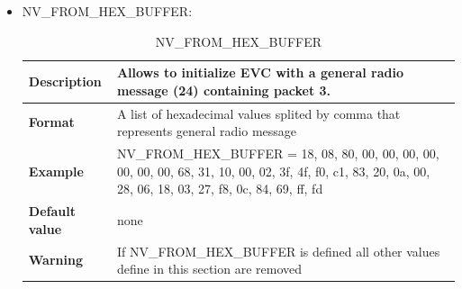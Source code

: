 \begin{itemize}
\begin{longtable}{|l|l|}
			\end{longtable}

		\item NV\_FROM\_HEX\_BUFFER:

			\begin{longtable}{|l|l|}
				\caption{NV\_FROM\_HEX\_BUFFER}\\
				\hline

					\begin{minipage}[t]{0.22\linewidth} \textbf{Description}	\end{minipage}
				&	\begin{minipage}[t]{0.78\linewidth} Allows to initialize EVC with a general radio message (24) containing packet 3. \end{minipage} \\

				\hline

					\begin{minipage}[t]{0.22\linewidth} \textbf{Format}	\end{minipage}
				&	\begin{minipage}[t]{0.78\linewidth}A list of hexadecimal values splited by comma that represents general radio message\end{minipage} \\

				\hline

					\begin{minipage}[t]{0.22\linewidth} \textbf{Example}	\end{minipage}
				&	\begin{minipage}[t]{0.78\linewidth} NV\_FROM\_HEX\_BUFFER = 18, 08, 80, 00, 00, 00, 00, 00, 00, 00, 68, 31, 10, 00, 02, 3f, 4f, f0, c1, 83, 20, 0a, 00, 28, 06, 18, 03, 27, f8, 0c, 84, 69, ff, fd \end{minipage} \\

				\hline

					\begin{minipage}[t]{0.22\linewidth} \textbf{Default value}	\end{minipage}
				&	\begin{minipage}[t]{0.78\linewidth} none \end{minipage} \\

				\hline
					\begin{minipage}[t]{0.22\linewidth} \textbf{Warning}	\end{minipage}
				&	\begin{minipage}[t]{0.78\linewidth} If NV\_FROM\_HEX\_BUFFER is defined all other values define in this section are removed\end{minipage} \\


\end{longtable}
\end{itemize}
